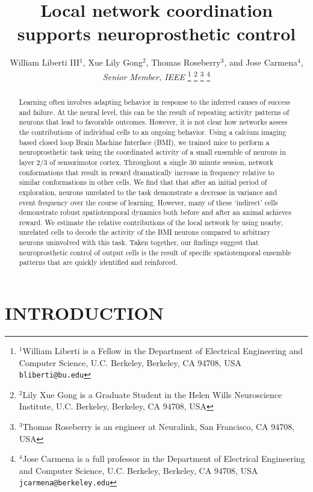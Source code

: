 \documentclass[letterpaper, 10 pt, conference]{ieeeconf}  %
\title{\LARGE \bf
 Local network coordination supports neuroprosthetic control
}
\author{William Liberti III$^{1}$, Xue Lily Gong$^{2}$, Thomas Roseberry$^{3}$, and Jose Carmena$^{4}$, \emph{Senior Member, IEEE}%
\thanks{$^{1}$William Liberti is a Fellow in the Department of Electrical Engineering and Computer Science, U.C. Berkeley, Berkeley, CA 94708, USA
        {\tt\small bliberti@bu.edu}}%
\thanks{$^{2}$Lily Xue Gong is a Graduate Student in the Helen Wills Neuroscience Institute, U.C. Berkeley, Berkeley, CA 94708, USA}
\thanks{$^{3}$Thomas Roseberry is an engineer at Neuralink, San Francisco, CA 94708, USA}
\thanks{$^{4}$Jose Carmena is a full professor in the Department of Electrical Engineering and Computer Science, U.C. Berkeley, Berkeley, CA 94708, USA
        {\tt\small jcarmena@berkeley.edu}}%
}
\begin{document}
\maketitle
\thispagestyle{empty}
\pagestyle{empty}


\begin{abstract}

Learning often involves adapting behavior in response to the inferred causes of success and failure. At the neural level, this can be the result of repeating activity patterns of neurons that lead to favorable outcomes. However, it is not clear how networks assess the contributions of individual cells to an ongoing behavior. Using a calcium imaging based closed loop Brain Machine Interface (BMI), we trained mice to perform a neuroprosthetic task using the coordinated activity of a small ensemble of neurons in layer 2/3 of sensorimotor cortex. Throughout a single 30 minute session, network conformations that result in reward dramatically increase in frequency relative to similar conformations in other cells. We find that that after an initial period of exploration, neurons unrelated to the task demonstrate a decrease in variance and event frequency over the course of learning. However, many of these `indirect' cells demonstrate robust spatiotemporal dynamics both before and after an animal achieves reward. We estimate the relative contributions of the local network by using nearby, unrelated cells to decode the activity of the BMI neurons compared to arbitrary neurons uninvolved with this task. Taken together, our findings suggest that neuroprosthetic control of output cells is the result of specific spatiotemporal ensemble patterns that are quickly identified and reinforced.




\end{abstract}


\section{INTRODUCTION}
\end{document}
